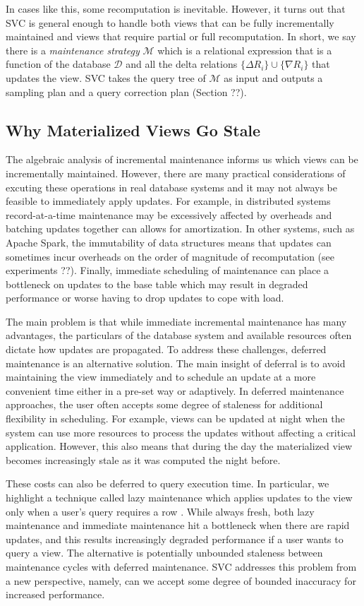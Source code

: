 In cases like this, some recomputation is inevitable.
However, it turns out that SVC is general enough to handle both views that can be fully incrementally maintained and views that require partial or full recomputation.
In short, we say there is a \emph{maintenance strategy} $\mathcal{M}$ which is a relational expression that is a function of the database $\mathcal{D}$ and all the delta relations $\{\Delta R_i\} \cup \{\nabla R_i\}$ that updates the view.
SVC takes the query tree of $\mathcal{M}$ as input and outputs a sampling plan and a query correction plan (Section ??).

\subsection{Why Materialized Views Go Stale}
The algebraic analysis of incremental maintenance informs us which views can be incrementally maintained.
However, there are many practical considerations of excuting these operations in real database systems and it may not always be feasible to immediately apply updates.
For example, in distributed systems record-at-a-time maintenance may be excessively affected by overheads and batching updates together can allows for amortization.
In other systems, such as Apache Spark, the immutability of data structures means that updates can sometimes incur overheads on the order of magnitude of recomputation (see experiments ??).
Finally, immediate scheduling of maintenance can place a bottleneck on updates to the base table which may result in degraded performance or worse having to drop updates to cope with load.

The main problem is that while immediate incremental maintenance has many advantages, the particulars of the database system and available resources often dictate how updates are propagated.
To address these challenges, deferred maintenance is an alternative solution.
The main insight of deferral is to avoid maintaining the view immediately and to schedule an update at a more convenient time either in a pre-set way or adaptively.
In deferred maintenance approaches, the user often accepts some degree of staleness for additional flexibility in scheduling.
For example, views can be updated at night when the system can use more resources to process the updates without affecting a critical application.
However, this also means that during the day the materialized view becomes increasingly stale as it was computed the night before.

These costs can also be deferred to query execution time.
In particular, we highlight a technique called lazy maintenance which applies updates to the view only when a user's query requires a row \cite{zhou2007lazy}.
While always fresh, both lazy maintenance and immediate maintenance hit a bottleneck when there are rapid updates, and this results increasingly degraded performance if a user wants to query a view.
The alternative is potentially unbounded staleness between maintenance cycles with deferred maintenance.
SVC addresses this problem from a new perspective, namely, can we accept some degree of bounded inaccuracy for increased performance.

